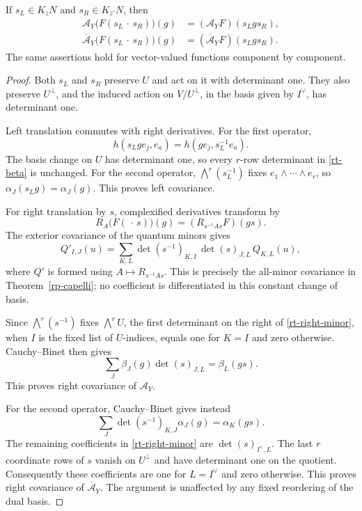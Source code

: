 \begin{proposition}\label{rt-full-covariance}
If $s_L\in K_zN$ and $s_R\in K_{z'}N$, then
\begin{align*}
 \mathcal A_Y\bigl(F(s_L\,\cdot\,s_R)\bigr)(g)
       &=(\mathcal A_YF)(s_Lgs_R),\\
 \overline{\mathcal A}_Y\bigl(F(s_L\,\cdot\,s_R)\bigr)(g)
       &=(\overline{\mathcal A}_YF)(s_Lgs_R).
\end{align*}
The same assertions hold for vector-valued functions
component by component.
\end{proposition}

\begin{proof}
Both $s_L$ and $s_R$ preserve $U$ and act on it with
determinant one.  They also preserve $U^\perp$, and
the induced action on $V/U^\perp$, in the basis
given by $I^\vee$, has determinant one.

Left translation commutes with right derivatives.
For the first operator,
\[
 h(s_Lge_j,e_a)=h(ge_j,s_L^{-1}e_a).
\]
The basis change on $U$ has determinant one, so every
$r$-row determinant in \eqref{rt-beta} is unchanged.
For the second operator,
$\bigwedge^r(s_L^{-1})$ fixes
$e_1\wedge\cdots\wedge e_r$, so
$\alpha_J(s_Lg)=\alpha_J(g)$.
This proves left covariance.

For right translation by $s$, complexified derivatives
transform by
\[
 R_A\bigl(F(\,\cdot\,s)\bigr)(g)
          =(R_{s^{-1}As}F)(gs).
\]
The exterior covariance of the quantum minors gives
\begin{equation}\label{rt-right-minor}
 Q'_{I,J}(u)
    =\sum_{K,L}\det(s^{-1})_{K,I}\,
                   \det(s)_{J,L}\,Q_{K,L}(u),
\end{equation}
where $Q'$ is formed using $A\mapsto R_{s^{-1}As}$.
This is precisely the all-minor covariance in
Theorem~\ref{rp-capelli}; no coefficient is
differentiated in this constant change of basis.

Since $\bigwedge^r(s^{-1})$ fixes $\bigwedge^rU$,
the first determinant on the right of
\eqref{rt-right-minor}, when $I$ is the fixed list
of $U$-indices, equals one for $K=I$ and zero otherwise.
Cauchy--Binet then gives
\[
 \sum_J \beta_J(g)\det(s)_{J,L}=\beta_L(gs).
\]
This proves right covariance of $\mathcal A_Y$.

For the second operator, Cauchy--Binet gives instead
\[
 \sum_J\det(s^{-1})_{K,J}\alpha_J(g)=\alpha_K(gs).
\]
The remaining coefficients in
\eqref{rt-right-minor} are $\det(s)_{I^\vee,L}$.
The last $r$ coordinate rows of $s$ vanish on
$U^\perp$ and have determinant one on the quotient.
Consequently these coefficients are one for
$L=I^\vee$ and zero otherwise.  This proves right
covariance of $\overline{\mathcal A}_Y$.
The argument is unaffected by any fixed reordering
of the dual basis.
\end{proof}

